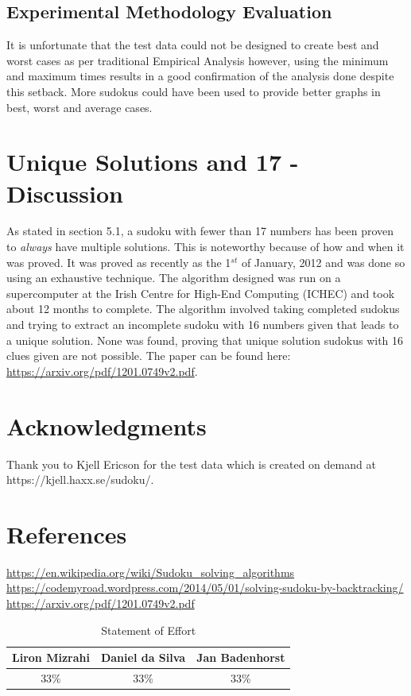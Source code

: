 \documentclass{article}
\begin{document}
\subsection{Experimental Methodology Evaluation}
It is unfortunate that the test data could not be designed to create best and worst cases as per traditional Empirical Analysis however, using the minimum and maximum times results in a good confirmation of the analysis done despite this setback. More sudokus could have been used to provide better graphs in best, worst and average cases.

\newpage
\section{Unique Solutions and 17 - Discussion}
As stated in section 5.1, a sudoku with fewer than 17 numbers has been proven to \emph{always} have multiple solutions. This is noteworthy because of how and when it was proved. It was proved as recently as the 1$^{st}$ of January, 2012 and was done so using an exhaustive technique. The algorithm designed was run on a supercomputer at the Irish Centre for High-End Computing (ICHEC) and took about 12 months to complete. The algorithm involved taking completed sudokus and trying to extract an incomplete sudoku with 16 numbers given that leads to a unique solution. None was found, proving that unique solution sudokus with 16 clues given are not possible. The paper can be found here: \url{https://arxiv.org/pdf/1201.0749v2.pdf}.

\section{Acknowledgments}
Thank you to Kjell Ericson for the test data which is created on demand at https://kjell.haxx.se/sudoku/.

\section{References}
\url{https://en.wikipedia.org/wiki/Sudoku_solving_algorithms} \\
\url{https://codemyroad.wordpress.com/2014/05/01/solving-sudoku-by-backtracking/}
\url{https://arxiv.org/pdf/1201.0749v2.pdf}\\

\begin{table}[H]
	\centering
	\begin{tabular}{|c|c|c|}
		\hline
		Liron Mizrahi & Daniel da Silva & Jan Badenhorst  \\ \hline
		33\%  & 33\%   & 33\% \\ \hline
	\end{tabular}
	\caption{Statement of Effort}
	\label{my-label}
\end{table}
\end{document}
